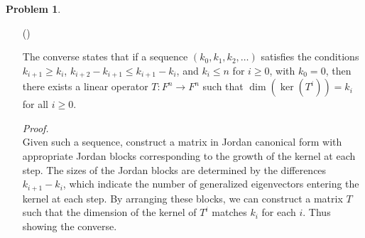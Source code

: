 \documentclass[12pt]{article}
\theoremstyle{definition}
\newtheorem{problem}{Problem}
\newcounter{subq}[problem]
\newenvironment{subproblem}
{\refstepcounter{subq} \begin{itemize} \item[(\alph{subq})]}
{\end{itemize} \medskip}
\begin{document}
\begin{problem}
\begin{subproblem}
        \begin{solution}
            The converse states that if a sequence $(k_0, k_1, k_2, \ldots)$ satisfies the conditions $k_{i+1} \geq k_i$, $k_{i+2} - k_{i+1} \leq k_{i+1} - k_i$, and $k_i \leq n$ for $i \geq 0$, with $k_0 = 0$, then there exists a linear operator $T: F^n \longrightarrow F^n$ such that $\dim(\ker(T^i)) = k_i$ for all $i \geq 0$.

            \textit{Proof.}\\
            Given such a sequence, construct a matrix in Jordan canonical form with appropriate Jordan blocks corresponding to the growth of the kernel at each step. The sizes of the Jordan blocks are determined by the differences $k_{i+1} - k_i$, which indicate the number of generalized eigenvectors entering the kernel at each step. By arranging these blocks, we can construct a matrix $T$ such that the dimension of the kernel of $T^i$ matches $k_i$ for each $i$. Thus showing the converse.
        \end{solution}
    \end{subproblem}
\end{problem}
\end{document}
